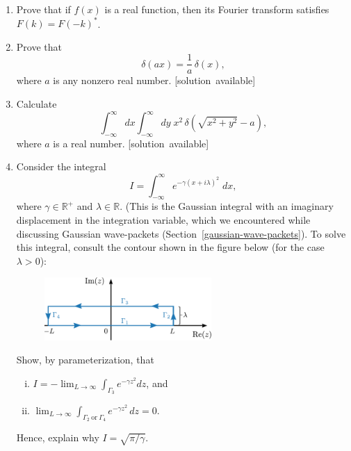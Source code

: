 \documentclass[10pt,a4paper]{article}
\begin{document}
\begin{enumerate}
\item
  Prove that if $f(x)$ is a real function, then its Fourier transform
  satisfies $F(k) = F(-k)^*$.

\item
  Prove that
  \begin{equation}
    \delta(ax) = \frac{1}{a}\,\delta(x),
  \end{equation}
  where $a$ is any nonzero real number.
  \hfill{\scriptsize [solution~available]}

\item Calculate
  \begin{equation}
    \int_{-\infty}^\infty dx \int_{-\infty}^\infty dy \;
    x^2\, \delta\left(\sqrt{x^2+y^2}-a\right),
  \end{equation}
  where $a$ is a real number.
  \hfill{\scriptsize [solution~available]}
  
\item
  Consider the integral $$I = \int_{-\infty}^\infty e^{-\gamma\left(x
    + i\lambda\right)^2} \; dx,$$ where $\gamma \in \mathbb{R}^+$ and
  $\lambda \in \mathbb{R}.$ (This is the Gaussian integral with an
  imaginary displacement in the integration variable, which we
  encountered while discussing Gaussian wave-packets
  (Section~\ref{gaussian-wave-packets}).  To solve this integral,
  consult the contour shown in the figure below (for the case $\lambda
  > 0$):

  \begin{figure}[ht]
    \centering\includegraphics[width=0.6\textwidth]{rectangular_contour}
  \end{figure}

  Show, by parameterization, that
  \begin{enumerate}[(i)]
  \item $\displaystyle I = - \lim_{L\rightarrow \infty} \int_{\Gamma_3} e^{-\gamma
    z^2} dz$, and
  \item $\displaystyle \lim_{L\rightarrow \infty} \int_{\Gamma_2~\text{or}~\Gamma_4}
  e^{-\gamma z^2}\, dz = 0.$
  \end{enumerate}
  Hence, explain why $I = \sqrt{\pi/\gamma}.$


\end{enumerate}
\end{document}
